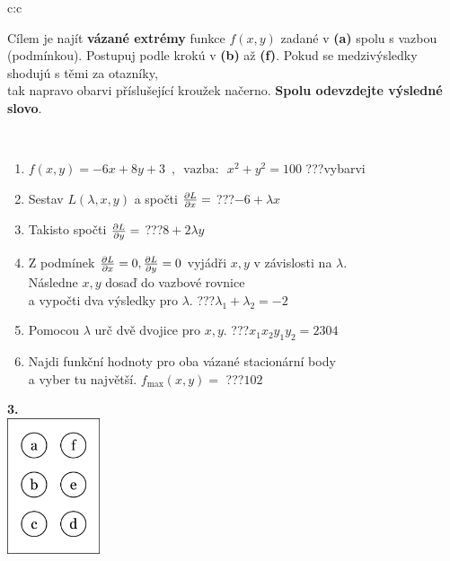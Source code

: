 \documentclass[10pt]{report}
\begin{document}
\begin{tabular}{c:c}
\begin{minipage}[c][104.5mm][t]{0.5\linewidth}
\begin{center}
\begin{minipage}{0.95\linewidth}
\begin{center}
Cílem je najít \textbf{vázané extrémy} funkce $f(x,y)$ zadané v \textbf{(a)} spolu s vazbou (podmínkou). Postupuj podle krokú v \textbf{(b)} až \textbf{(f)}. Pokud se medzivýsledky shodujú s těmi za otazníky,\\tak napravo obarvi příslušející kroužek načerno. \textbf{Spolu odevzdejte výsledné slovo}.
\end{center}
\end{minipage}
\\[1mm]
\begin{minipage}{0.79\linewidth}
\begin{center}
\begin{varwidth}{\linewidth}
\begin{enumerate}
\normalsize
\item $f(x,y)=-6x+8y+3 \enspace , \enspace \mathrm{vazba:} \enspace x^2+y^2=100$\quad \dotfill\; ???\;\dotfill \quad vybarvi
\item Sestav $L(\lambda,x,y)$ a spočti $\pdv{L}{x}=$\quad \dotfill\; ???\;\dotfill \quad $-6+\lambda x$
\item Takisto spočti $\pdv{L}{y}=$\quad \dotfill\; ???\;\dotfill \quad $8+2\lambda y$
\item Z podmínek $\pdv{L}{x}=0 , \pdv{L}{y}=0$ vyjádři $x,y$ v závislosti na $\lambda$.\\ \phantom{xxxxxx}Následne $x,y$ dosaď do vazbové rovnice\\ \phantom{xxxxxx}a vypočti dva výsledky pro $\lambda$.\quad \dotfill\; ???\;\dotfill \quad $\lambda_1+\lambda_2=-2$
\item Pomocou $\lambda$ urč dvě dvojice pro $x,y$.\quad \dotfill\; ???\;\dotfill \quad $x_1 x_2 y_1 y_2=2304$
\item Najdi funkční hodnoty pro oba vázané stacionární body\\ \phantom{xxxxxx}a vyber tu najvětší. $f_{\text{max}}(x,y)=$\quad \dotfill\; ???\;\dotfill \quad $102$
\end{enumerate}
\end{varwidth}
\end{center}
\end{minipage}
\begin{minipage}{0.20\linewidth}
\begin{center}
{\Huge\bfseries 3.} \\[2mm]
\includegraphics[height=40mm]{../images/braille.png}

\end{center}
\end{minipage}
\end{center}
\end{minipage}
\end{tabular}
\end{document}

